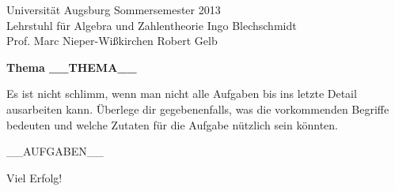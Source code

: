 \documentclass{../algblatt}
\begin{document}
\vspace*{-1.2cm}

Universität Augsburg \hfill Sommersemester 2013 \\
Lehrstuhl für Algebra und Zahlentheorie \hfill Ingo Blechschmidt \\
Prof. Marc Nieper-Wißkirchen \hfill Robert Gelb \\[0em]

\begin{center}
  {\Large \textbf{Thema __THEMA__}} \\[2.6em]

  \begin{minipage}{0.93\textwidth}
    \setlength\parskip{\medskipamount}
    Es ist nicht schlimm, wenn man nicht alle Aufgaben bis ins letzte Detail
    ausarbeiten kann. Überlege dir gegebenenfalls, was die
    vorkommenden Begriffe bedeuten und welche Zutaten für die Aufgabe nützlich
    sein könnten.
  \end{minipage}
\end{center}
\vspace{1em}

\pruefungtrue

__AUFGABEN__

\begin{center}Viel Erfolg!\end{center}
\end{document}
